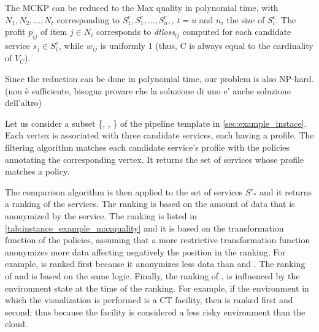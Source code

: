 The MCKP can be reduced to the Max quality \problem in polynomial time, with $N_1,N_2,\ldots,N_t$ corresponding to $S^c_{1}, S^c_{1}, \ldots, S^c_{u},$, $t$$=$$u$ and $n_i$ the size of $S^c_{i}$. The profit $p_{ij}$ of item $j$$\in$$N_i$ corresponds to \textit{dtloss}$_{ij}$ computed for each candidate service $s_j$$\in$$S^c_{i}$, while $w_{ij}$ is uniformly 1 (thus, C is always equal to the cardinality of $V_C$).

Since the reduction can be done in polynomial time, our problem is also NP-hard. (non è sufficiente, bisogna provare che la soluzione di uno e' anche soluzione dell'altro)


\begin{example}
  Let us consider a subset \{, , \} of the pipeline template \tChartFunction in \cref{sec:example_instace}.
  Each vertex is associated with three candidate services, each having a profile. The filtering algorithm matches each candidate service's profile with the policies annotating the corresponding vertex. It returns the set of services whose profile matches a policy.

  The comparison algorithm is then applied to the set of services $S'_*$ and it returns a ranking of the services.
  The ranking is based on the amount of data that is anonymized by the service.
  The ranking is listed in \cref{tab:instance_example_maxquality} and it is based on the transformation function of the policies,
  assuming that a more restrictive transformation function anonymizes more data affecting negatively the position in the ranking.
  For example,  is ranked first because it anonymizes less data than  and .
  The ranking of  and  is based on the same logic.
  Finally, the ranking of ,  is influenced by the environment state at the time of the ranking.
  For example, if the environment in which the visualization is performed is a CT facility, then  is ranked first and  second;
  thus because the facility is considered a less risky environment than the cloud.

\end{example}


